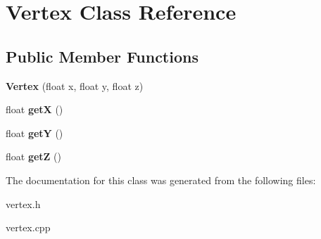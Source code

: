 \hypertarget{classVertex}{\section{Vertex Class Reference}
\label{classVertex}
}
\subsection*{Public Member Functions}
\begin{DoxyCompactItemize}
\item 
\hypertarget{classVertex_a2c558c054a0a2c970588c063073803a0}{{\bfseries Vertex} (float x, float y, float z)}\label{classVertex_a2c558c054a0a2c970588c063073803a0}

\item 
\hypertarget{classVertex_aa78d4c3433559e6e50260240c49a3d03}{float {\bfseries get\-X} ()}\label{classVertex_aa78d4c3433559e6e50260240c49a3d03}

\item 
\hypertarget{classVertex_a12facdc9f554fd718e449f2aa2eefeaf}{float {\bfseries get\-Y} ()}\label{classVertex_a12facdc9f554fd718e449f2aa2eefeaf}

\item 
\hypertarget{classVertex_a258fea59f7c07f4e8784fc90c6ac7cb3}{float {\bfseries get\-Z} ()}\label{classVertex_a258fea59f7c07f4e8784fc90c6ac7cb3}

\end{DoxyCompactItemize}


The documentation for this class was generated from the following files\-:\begin{DoxyCompactItemize}
\item 
vertex.\-h\item 
vertex.\-cpp\end{DoxyCompactItemize}
